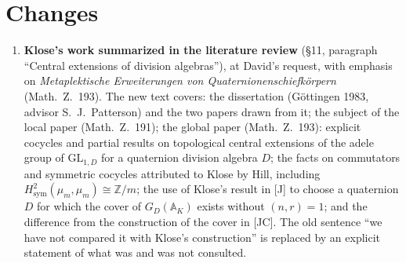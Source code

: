 \documentclass[11pt]{article}
\begin{document}
\section*{Changes}
\begin{enumerate}[leftmargin=*]
\item \textbf{Klose's work summarized in the literature review}
(\S11, paragraph ``Central extensions of division algebras''), at
David's request, with emphasis on \emph{Metaplektische Erweiterungen
von Quaternionenschiefk\"orpern} (Math.\ Z.\ 193).  The new text
covers: the dissertation (G\"ottingen 1983, advisor S.~J.~Patterson)
and the two papers drawn from it; the subject of the local paper
(Math.\ Z.\ 191); the global paper (Math.\ Z.\ 193): explicit cocycles
and partial results on topological central extensions of the adele
group of $\mathrm{GL}_{1,D}$ for a quaternion division algebra $D$;
the facts on commutators and symmetric cocycles attributed to Klose by
Hill, including $H^2_{\mathrm{sym}}(\mu_m,\mu_m)\cong\mathbb Z/m$; the
use of Klose's result in [J] to choose a quaternion $D$ for which the
cover of $G_D(\mathbb A_K)$ exists without $(n,r)=1$; and the
difference from the construction of the cover in [JC].  The old
sentence ``we have not compared it with Klose's construction'' is
replaced by an explicit statement of what was and was not consulted.


\end{enumerate}
\end{document}

